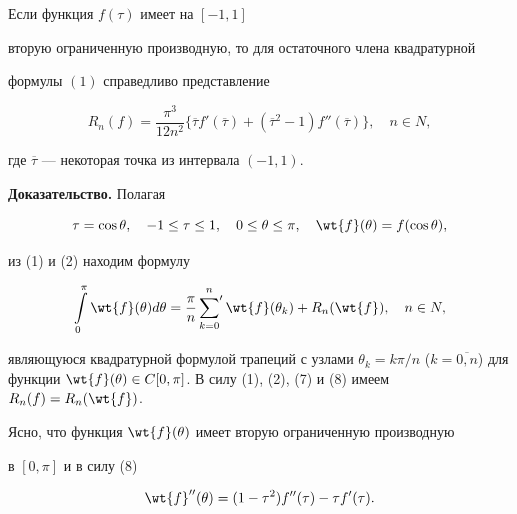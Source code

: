 \begin{thm}


Если функция $f( \tau)$ имеет на $[-1,1]$


вторую ограниченную производную, то для остаточного члена квадратурной


формулы $(1)$ справедливо представление


\begin{equation}


R_n(f) =  \frac{ \pi^3}{12n^2} \lbrace \overline{ \tau}


f'(\overline{\tau}) + (\overline{\tau}^2 - 1) f''(\overline{\tau})


\rbrace, \quad n \in N,


\end{equation}


где $\overline{\tau}$ --- некоторая точка из интервала $(-1,1)$.


\end{thm}





{\bf Доказательство.} Полагая


\begin{equation}


\tau = \cos \theta, \quad -1 \leq \tau \leq 1, \quad 0 \leq \theta


\leq \pi, \quad \wt{f}( \theta) = f( \cos \theta),


\end{equation}


из (1) и (2) находим формулу


\begin{equation}


\int \limits_0^ \pi \wt{f}( \theta) d \theta = \frac{\pi}{n}


\sideset{}{'}\sum_{k=0}^n \wt{f}( \theta_k) + R_n( \wt{f}), \quad n \in N,


\end{equation}


являющуюся квадратурной формулой трапеций с узлами $\theta_k = 


k\pi/n$ ($k=\overline{0,n}$) для функции $\wt{f}(\theta) \in 


C[0,\pi]$. В силу (1), (2), (7) и (8) имеем $R_n(f) = R_n( \wt{f})$.


Ясно, что функция $\wt{f}(\theta)$ имеет вторую ограниченную производную


в $ [0,\pi] $ и в силу (8)


\begin{equation}


\wt{f}''(\theta) = (1-\tau^2) f''(\tau) - \tau f'(\tau).


\end{equation}



